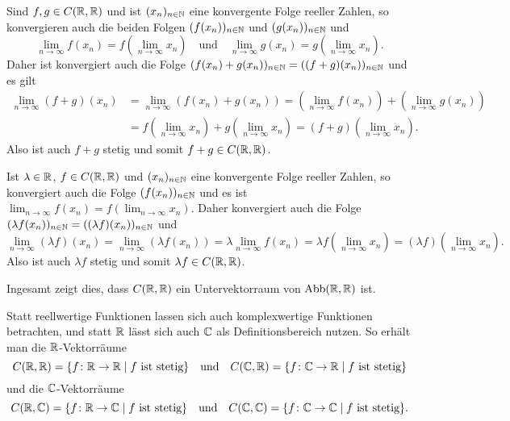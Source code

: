 Sind $f,g \in C(\mathbb{R},\mathbb{R})$ und ist $(x_n)_{n \in \mathbb{N}}$ eine konvergente Folge reeller Zahlen, so konvergieren auch die beiden Folgen $(f(x_n))_{n \in \mathbb{N}}$ und $(g(x_n))_{n \in \mathbb{N}}$ und
\[
 \lim_{n \to \infty} f(x_n) = f\left( \lim_{n \to \infty} x_n \right)
 \quad\text{und}\quad
 \lim_{n \to \infty} g(x_n) = g\left( \lim_{n \to \infty} x_n \right).
\]
Daher ist konvergiert auch die Folge $(f(x_n) + g(x_n))_{n \in \mathbb{N}} = ((f+g)(x_n))_{n \in \mathbb{N}}$ und es gilt
\begin{align*}
 \lim_{n \to \infty} (f+g)(x_n)
 &= \lim_{n \to \infty} (f(x_n) + g(x_n))
 = \left(\lim_{n \to \infty} f(x_n)\right) + \left(\lim_{n \to \infty} g(x_n)\right) \\
 &=f\left( \lim_{n \to \infty} x_n \right) + g\left( \lim_{n \to \infty} x_n \right)
 = (f+g)\left( \lim_{n \to \infty} x_n \right).
\end{align*}
Also ist auch $f+g$ stetig und somit $f+g \in C(\mathbb{R}, \mathbb{R})$.

Ist $\lambda \in \mathbb{R}$, $f \in C(\mathbb{R}, \mathbb{R})$ und $(x_n)_{n \in \mathbb{N}}$ eine konvergente Folge reeller Zahlen, so konvergiert auch die Folge $(f(x_n))_{n \in \mathbb{N}}$ und es ist $\lim_{n \to \infty} f(x_n) = f(\lim_{n \to \infty} x_n)$. Daher konvergiert auch die Folge $(\lambda f(x_n))_{n \in \mathbb{N}} = ((\lambda f)(x_n))_{n \in \mathbb{N}}$ und
\[
 \lim_{n \to \infty} (\lambda f)(x_n)
 = \lim_{n \to \infty}( \lambda f(x_n) )
 = \lambda \lim_{n \to \infty} f(x_n)
 = \lambda f\left( \lim_{n \to \infty} x_n \right)
 = (\lambda f) \left( \lim_{n \to \infty} x_n \right).
\]
Also ist auch $\lambda f$ stetig und somit $\lambda f \in C(\mathbb{R}, \mathbb{R})$.

Ingesamt zeigt dies, dass $C(\mathbb{R}, \mathbb{R})$ ein Untervektorraum von $\mathrm{Abb}(\mathbb{R}, \mathbb{R})$ ist.


\begin{bem}
 Statt reellwertige Funktionen lassen sich auch komplexwertige Funktionen betrachten, und statt $\mathbb{R}$ lässt sich auch $\mathbb{C}$ als Definitionsbereich nutzen. So erhält man die $\mathbb{R}$-Vektorräume
 \[
  C(\mathbb{R},\mathbb{R}) = \{f \colon \mathbb{R} \to \mathbb{R} \mid \text{$f$ ist stetig}\}
  \quad\text{und}\quad
  C(\mathbb{C},\mathbb{R}) = \{f \colon \mathbb{C} \to \mathbb{R} \mid \text{$f$ ist stetig}\}
 \]
 und die $\mathbb{C}$-Vektorräume
 \[
  C(\mathbb{R},\mathbb{C}) = \{f \colon \mathbb{R} \to \mathbb{C} \mid \text{$f$ ist stetig}\}
  \quad\text{und}\quad
  C(\mathbb{C},\mathbb{C}) = \{f \colon \mathbb{C} \to \mathbb{C} \mid \text{$f$ ist stetig}\}.
 \]
\end{bem}

















